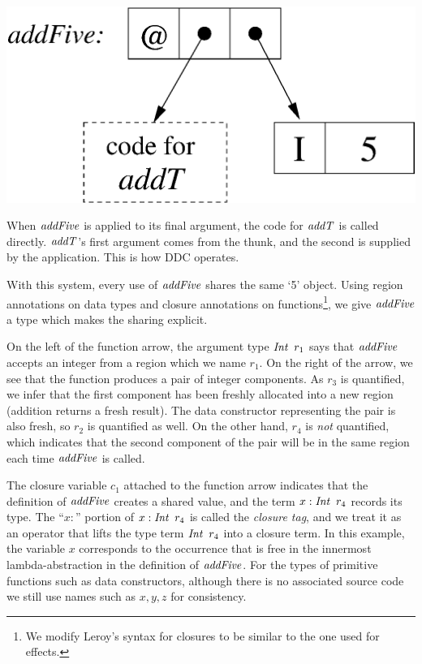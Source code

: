 \begin{center}
\includegraphics[scale=0.4]{2-System/fig/closure-super.eps}
\end{center}

When $\operatorname{\mathit{addFive}}$ is applied to its final argument, the code for $\operatorname{\mathit{addT}}$ is called directly. $\operatorname{\mathit{addT}}$'s first argument comes from the thunk, and the second is supplied by the application. This is how DDC operates.

With this system, every use of $\operatorname{\mathit{addFive}}$ shares the same `5' object. Using region annotations on data types and closure annotations on functions\footnote{We modify Leroy's syntax for closures to be similar to the one used for effects.}, we give $\operatorname{\mathit{addFive}}$ a type which makes the sharing explicit.


On the left of the function arrow, the argument type $\operatorname{\mathit{Int}} \ r_1$ says that $\operatorname{\mathit{addFive}}$ accepts an integer from a region which we name $r_1$. On the right of the arrow, we see that the function produces a pair of integer components. As $r_3$ is quantified, we infer that the first component has been freshly allocated into a new region (addition returns a fresh result). The data constructor representing the pair is also fresh, so $r_2$ is quantified as well. On the other hand, $r_4$ is \emph{not} quantified, which indicates that the second component of the pair will be in the same region each time $\operatorname{\mathit{addFive}}$ is called. 

The closure variable $c_1$ attached to the function arrow indicates that the definition of $\operatorname{\mathit{addFive}}$ creates a shared value, and the term $x : \operatorname{\mathit{Int}} \ r_4$ records its type. The ``$x :$'' portion of $x : \operatorname{\mathit{Int}} \ r_4$ is called the \emph{closure tag}, and we treat it as an operator that lifts the type term $\operatorname{\mathit{Int}} \ r_4$ into a closure term. In this example, the variable $x$ corresponds to the occurrence that is free in the innermost lambda-abstraction in the definition of $\operatorname{\mathit{addFive}}$. For the types of primitive functions such as data constructors, although there is no associated source code we still use names such as $x, y, z$ for consistency. 

